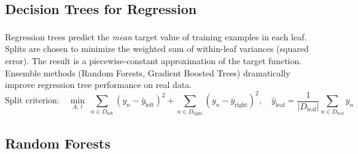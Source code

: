 \subsection{Decision Trees for Regression}

\begin{tcbitemize}[ skin=sectionraster ]
    \tcbitem[title={Regression Trees: Piecewise-Constant Approximation}, raster multicolumn=6]
    Regression trees predict the \emph{mean} target value of training examples in each leaf\textsuperscript{\cite[][pp.~8--20]{iiiCourseMachineLearning}}. Splits are chosen to minimize the weighted sum of within-leaf variances (squared error). The result is a piecewise-constant approximation of the target function. Ensemble methods (Random Forests, Gradient Boosted Trees) dramatically improve regression tree performance on real data.
    \tcblower
    \begin{equation}
        \text{Split criterion:} \quad
        \min_{A,\, t}\;\sum_{n \in D_{\text{left}}}\!\!(y_n - \bar{y}_{\text{left}})^2
        +\sum_{n \in D_{\text{right}}}\!\!(y_n - \bar{y}_{\text{right}})^2,
        \quad
        \hat{y}_{\text{leaf}} = \frac{1}{|D_{\text{leaf}}|}\sum_{n \in D_{\text{leaf}}} y_n
    \end{equation}
\end{tcbitemize}

\subsection{Random Forests}


